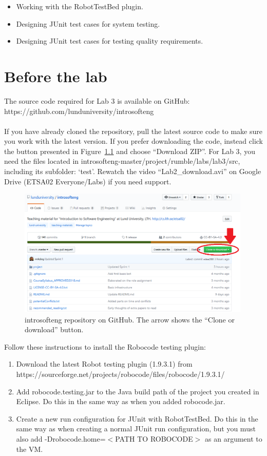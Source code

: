 \documentclass{scrreprt}
\begin{document}
\begin{itemize}
\item Working with the RobotTestBed plugin.
\item Designing JUnit test cases for system testing.
\item Designing JUnit test cases for testing quality requirements.
\end{itemize}

\chapter{Before the lab}
The source code required for Lab 3 is available on GitHub:\\https://github.com/lunduniversity/introsofteng\\\\
If you have already cloned the repository, pull the latest source code to make sure you work with the latest version. If you prefer downloading the code, instead click the button presented in Figure~\ref{fig:github} and choose ``Download ZIP''. For Lab 3, you need the files located in introsofteng-master/project/rumble/labs/lab3/src, including its subfolder: `test'. Rewatch the video ``Lab2_download.avi'' on Google Drive (ETSA02 Everyone/Labs) if you need support.

\begin{figure}
\centering
\includegraphics[width=0.99\textwidth]{figures/GitHub.png}
\caption{introsofteng repository on GitHub. The arrow shows the ``Clone or download'' button.}
\label{fig:github}
\end{figure}

Follow these instructions to install the Robocode testing plugin:

\begin{enumerate}
\item Download the latest Robot testing plugin (1.9.3.1) from\\https://sourceforge.net/projects/robocode/files/robocode/1.9.3.1/
\item Add robocode.testing.jar to the Java build path of the project you created in Eclipse. Do this in the same way as when you added robocode.jar.
\item Create a new run configuration for JUnit with RobotTestBed. Do this in the same way as when creating a normal JUnit run configuration, but you must also add -Drobocode.home=$<$PATH TO ROBOCODE$>$ as an argument to the VM.
\end{enumerate}
\end{document}
